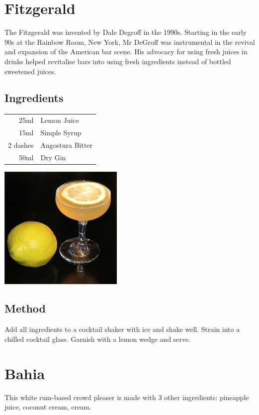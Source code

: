 \documentclass[12pt, letterpaper]{article}
\begin{document}
\pagebreak
\section{Fitzgerald}
The Fitzgerald was invented by Dale Degroff in the 1990s. Starting in the early 90s at the Rainbow Room,
New York, Mr DeGroff was instrumental in the revival and expansion of the American bar scene.
His advocacy for using fresh juices in drinks helped revitalise bars into using fresh ingredients instead of bottled sweetened juices.

\subsection*{Ingredients}

\begin{multicols}{2}

\begin{tabular} { r | l}
    25ml & Lemon Juice \\
    15ml & Simple Syrup \\
    2 dashes & Angostura Bitter \\
    50ml & Dry Gin
\end{tabular}

\includegraphics[height=6cm]{fitzgerald}

\end{multicols}


\subsection*{Method}
Add all ingredients to a cocktail shaker with ice and shake well.
Strain into a chilled cocktail glass. Garnish with a lemon wedge and serve.

\pagebreak
\section{Bahia}
This white rum-based crowd pleaser is made with 3 other ingredients: pineapple juice, coconut cream, cream.
\end{document}
